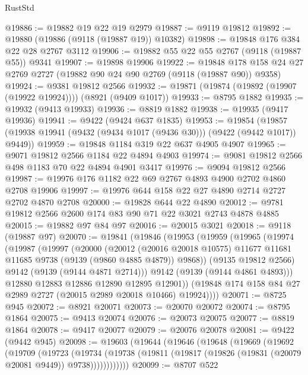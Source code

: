\begin{lexlean}{RustStd}
\begin{coremodule}
@19886 := @19882 @19 @22 @19 @2979
@19887 := @9119 @19812
@19892 := @19880 (@19886 (@9118 (@19887 @19)) @10382)
@19898 := @19848 @176 @384 @22 @28 @2767 @3112
@19906 := @19882 @55 @22 @55 @2767 (@9118 (@19887 @55)) @9341
@19907 := @19898 @19906
@19922 := @19848 @178 @158 @24 @27 @2769 @2727 (@19882 @90 @24 @90 @2769 (@9118 (@19887 @90)) @9358)
@19924 := @9381 @19812 @2566
@19932 := @19871 (@19874 (@19892 (@19907 (@19922 @19924)))) (@8921 (@9409 @1017))
@19933 := @8795 @1882
@19935 := @19932 (@9413 @19933)
@19936 := @8819 @1882
@19938 := @19935 (@9417 @19936)
@19941 := @9422 (@9424 @637 @1835)
@19953 := @19854
    (@19857 (@19938 @19941 (@9432 (@9434 @1017 (@9436 @30))) (@9422 (@9442 @1017)) @9449))
@19959 := @19848 @1184 @319 @22 @637 @4905 @4907
@19965 := @9071 @19812 @2566 @1184 @22 @4894 @4903
@19974 := @9081 @19812 @2566 @498 @1183 @70 @22 @4894 @4901 @3417
@19976 := @9094 @19812 @2566
@19987 := @19976 @176 @1182 @22 @69 @2767 @4893 @4900 @2702 @4860 @2708 @19906
@19997 := @19976 @644 @158 @22 @27 @4890 @2714 @2727 @2702 @4870 @2708
@20000 := @19828 @644 @22 @4890
@20012 := @9781 @19812 @2566 @2600 @174 @83 @90 @71 @22 @3021 @2743 @4878 @4885
@20015 := @19882 @97 @84 @97
@20016 := @20015 @3021
@20018 := @9118 (@19887 @97)
@20070 := @19841
    (@19846
      (@19953
        (@19959
          (@19965
            (@19974
              (@19987
                (@19997
                  (@20000
                    (@20012
                      (@20016 @20018 @10575)
                      @11677
                      @11681
                      @11685
                      @9738
                      (@9139 (@9860 @4885 @4879))
                      @9868))
                  (@9135 @19812 @2566)
                  @9142
                  (@9139 (@9144 @4871 @2714)))
                @9142
                (@9139 (@9144 @4861 @4893)))
              @12880
              @12883
              @12886
              @12890
              @12895
              @12901))
          (@19848 @174 @158 @84 @27 @2989 @2727 (@20015 @2989 @20018 @10466) @19924))))
@20071 := @8725 @945
@20072 := @8921 @20071
@20073 := @20070 @20072
@20074 := @8795 @1864
@20075 := @9413 @20074
@20076 := @20073 @20075
@20077 := @8819 @1864
@20078 := @9417 @20077
@20079 := @20076 @20078
@20081 := @9422 (@9442 @945)
@20098 := @19603
    (@19644
      (@19646
        (@19648
          (@19669
            (@19692
              (@19709
                (@19723
                  (@19734
                    (@19738 (@19811 (@19817 (@19826 (@19831 (@20079 @20081 @9449)) @9738))))))))))))
@20099 := @8707 @522

\end{coremodule}
\end{lexlean}
